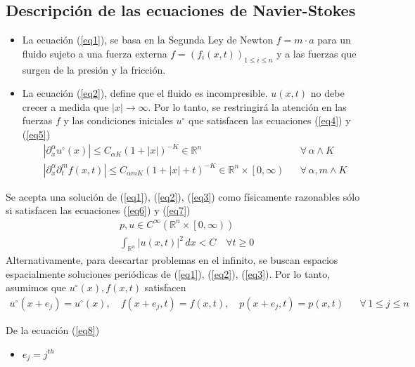 \subsection{Descripción de las ecuaciones de Navier-Stokes}
\begin{itemize}
    \item La ecuación (\ref{eq1}), se basa en la Segunda Ley de Newton $f=m\cdot a$ para un fluido sujeto a una fuerza externa $f= \left(f_i(x,t)\right)_{1\leq i\leq n}$ y a las fuerzas que surgen de la presión y la fricción.
    \item La ecuación (\ref{eq2}), define que el fluido es incompresible.  $u(x, t)$ no debe crecer a medida que $\left\lvert x\right\rvert \to \infty$. Por lo tanto, se restringirá la atención en las fuerzas $f$ y las condiciones iniciales $u^{\circ}$ que satisfacen las ecuaciones (\ref{eq4}) y (\ref{eq5})
    \begin{align}
        &\left\lvert \partial_x^{\alpha}u^{\circ}(x) \right\rvert\leq C_{\alpha K}\left(1 + \left\lvert x \right\rvert  \right)^{-K}\in \mathbb{R}^n&& \forall\, \alpha\land K\label{eq4}\\
        &\left\lvert \partial_x^{\alpha}\partial_t^{m} f(x,t) \right\rvert\leq C_{\alpha m K}\left(1 + \left\lvert x \right\rvert + t \right)^{-K}\in \mathbb{R}^n\times \left[ 0,\infty \right)&& \forall\, \alpha, m \land K \label{eq5}
    \end{align}
\end{itemize}
Se acepta una solución de (\ref{eq1}), (\ref{eq2}), (\ref{eq3}) como físicamente razonables sólo si satisfacen las ecuaciones (\ref{eq6}) y (\ref{eq7})
\begin{align}
    &p,u\in C^{\infty}\left( \mathbb{R}^n \times \left[ 0, \infty\right) \right)\label{eq6}\\
    & \int_{\mathbb{R}^n} \left\lvert u(x,t)\right\rvert^2\, dx < C\quad \forall t\geq 0\label{eq7}  
\end{align}
Alternativamente, para descartar problemas en el infinito, se buscan espacios espacialmente soluciones periódicas de (\ref{eq1}), (\ref{eq2}), (\ref{eq3}). Por lo tanto, asumimos que $u^{\circ}(x), f(x,t)$ satisfacen
\begin{align}
    u^{\circ}(x + e_j) = u^{\circ}(x),\quad f(x + e_j,t) = f(x,t),\quad p(x + e_j,t) = p(x,t) && \forall\, 1\leq j\leq n\label{eq8}
\end{align}
\begin{notation} De la ecuación (\ref{eq8})
    \begin{itemize}
        \item $e_j = j^{th}$
    \end{itemize}
\end{notation}
